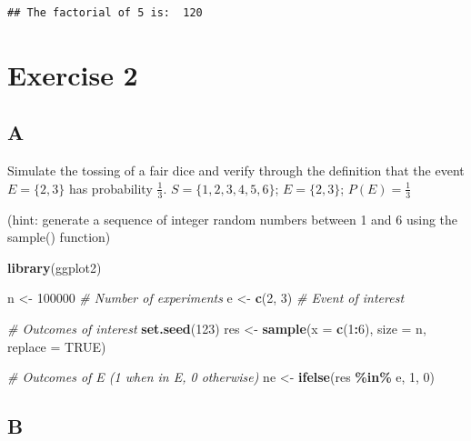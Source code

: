 \documentclass[
]{article}
\newenvironment{Shaded}{\begin{snugshade}}{\end{snugshade}}
\newcommand{\CommentTok}[1]{\textcolor[rgb]{0.56,0.35,0.01}{\textit{#1}}}
\newcommand{\DataTypeTok}[1]{\textcolor[rgb]{0.13,0.29,0.53}{#1}}
\newcommand{\DecValTok}[1]{\textcolor[rgb]{0.00,0.00,0.81}{#1}}
\newcommand{\KeywordTok}[1]{\textcolor[rgb]{0.13,0.29,0.53}{\textbf{#1}}}
\newcommand{\NormalTok}[1]{#1}
\newcommand{\OperatorTok}[1]{\textcolor[rgb]{0.81,0.36,0.00}{\textbf{#1}}}
\newcommand{\OtherTok}[1]{\textcolor[rgb]{0.56,0.35,0.01}{#1}}
\newcommand{\StringTok}[1]{\textcolor[rgb]{0.31,0.60,0.02}{#1}}
\begin{document}
\begin{verbatim}
## The factorial of 5 is:  120
\end{verbatim}

\hypertarget{exercise-2}{%
\section{Exercise 2}\label{exercise-2}}

\hypertarget{a-1}{%
\subsection{A}\label{a-1}}

Simulate the tossing of a fair dice and verify through the definition
that the event \(E = \{ 2,3 \}\) has probability \(\frac{1}{3}\).
\(S = \{ 1,2,3,4,5,6 \}\); \(E = \{ 2,3 \}\); \(P(E) = \frac{1}{3}\)

(hint: generate a sequence of integer random numbers between 1 and 6
using the sample() function)

\begin{Shaded}
\begin{Highlighting}[]
\KeywordTok{library}\NormalTok{(ggplot2)}

\NormalTok{n \textless{}{-}}\StringTok{ }\DecValTok{100000} \CommentTok{\# Number of experiments}
\NormalTok{e \textless{}{-}}\StringTok{ }\KeywordTok{c}\NormalTok{(}\DecValTok{2}\NormalTok{, }\DecValTok{3}\NormalTok{) }\CommentTok{\# Event of interest}

\CommentTok{\# Outcomes of interest}
\KeywordTok{set.seed}\NormalTok{(}\DecValTok{123}\NormalTok{)}
\NormalTok{res \textless{}{-}}\StringTok{ }\KeywordTok{sample}\NormalTok{(}\DataTypeTok{x =} \KeywordTok{c}\NormalTok{(}\DecValTok{1}\OperatorTok{:}\DecValTok{6}\NormalTok{), }\DataTypeTok{size =}\NormalTok{ n, }\DataTypeTok{replace =} \OtherTok{TRUE}\NormalTok{)}

\CommentTok{\# Outcomes of E (1 when in E, 0 otherwise)}
\NormalTok{ne \textless{}{-}}\StringTok{ }\KeywordTok{ifelse}\NormalTok{(res }\OperatorTok{\%in\%}\StringTok{ }\NormalTok{e, }\DecValTok{1}\NormalTok{, }\DecValTok{0}\NormalTok{)}
\end{Highlighting}
\end{Shaded}

\hypertarget{b-1}{%
\subsection{B}\label{b-1}}
\end{document}
